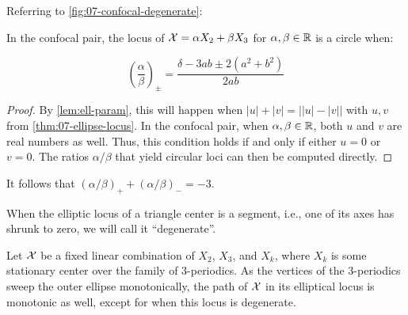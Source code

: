 Referring to \cref{fig:07-confocal-degenerate}:

\begin{proposition}
In the confocal pair, the locus of $\mathcal{X}=\alpha X_2+\beta X_3$ for $\alpha,\beta\in\mathbb{R}$ is a circle when:

\[\left(\frac{\alpha}{\beta}\right)_{\pm}=\frac{\delta-3 a b\pm 2\left(a^2+b^2\right)}{2 a b} \]
\end{proposition}

\begin{proof}
By \cref{lem:ell-param}, this will happen when $|u|+|v|=\big||u|-|v|\big|$ with $u,v$ from \cref{thm:07-ellipse-locus}. In the confocal pair, when $\alpha,\beta\in\mathbb{R}$, both $u$ and $v$ are real numbers as well. Thus, this condition holds if and only if either $u=0$ or $v=0$. The ratios $\alpha/\beta$ that yield circular loci can then be computed directly.
\end{proof}

\begin{observation}
It follows that $\left({\alpha}/{\beta}\right)_+ +\left({\alpha}/{\beta}\right)_-=-3$.
\end{observation}

\begin{definition} When the elliptic locus of a triangle center is a segment, i.e., one of its axes has shrunk to zero, we will call it ``degenerate''.
\end{definition}

\begin{proposition}
Let $\mathcal{X}$ be a fixed linear combination of $X_2$, $X_3$, and $X_k$, where $X_k$ is some stationary center over the family of 3-periodics. As the vertices of the 3-periodics sweep the outer ellipse monotonically, the path of $\mathcal{X}$ in its elliptical locus is monotonic as well, except for when this locus is degenerate.
\end{proposition}

